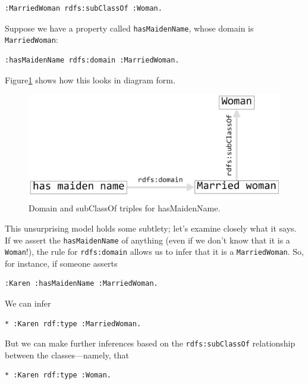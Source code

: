 \begin{lstlisting}
:MarriedWoman rdfs:subClassOf :Woman.
\end{lstlisting}

Suppose we have a property called \texttt{hasMaidenName}, whose domain is
\texttt{MarriedWoman}:

\begin{lstlisting}
:hasMaidenName rdfs:domain :MarriedWoman.
\end{lstlisting}

Figure\ref{fig:ch8.2} shows how this looks in diagram form.

\begin{figure}
\centering
\includegraphics[width=5in]{SWWOv3/media/ch8/figure8-2.png}
\caption{Domain and subClassOf triples for hasMaidenName.}
\label{fig:ch8.2}
\end{figure}


This unsurprising model holds some subtlety; let's examine closely what
it says. If we assert the \texttt{hasMaidenName} of anything (even if we don't
know that it is a \texttt{Woman}!), the rule for \texttt{rdfs:domain} allows us to infer
that it is a \texttt{MarriedWoman}. So, for instance, if someone asserts

\begin{lstlisting}
:Karen :hasMaidenName :MarriedWoman.
\end{lstlisting}

We can infer

\begin{lstlisting}
* :Karen rdf:type :MarriedWoman.
\end{lstlisting}

But we can make further inferences based on the \texttt{rdfs:subClassOf}
relationship between the classes---namely, that

\begin{lstlisting}
* :Karen rdf:type :Woman.
\end{lstlisting}

